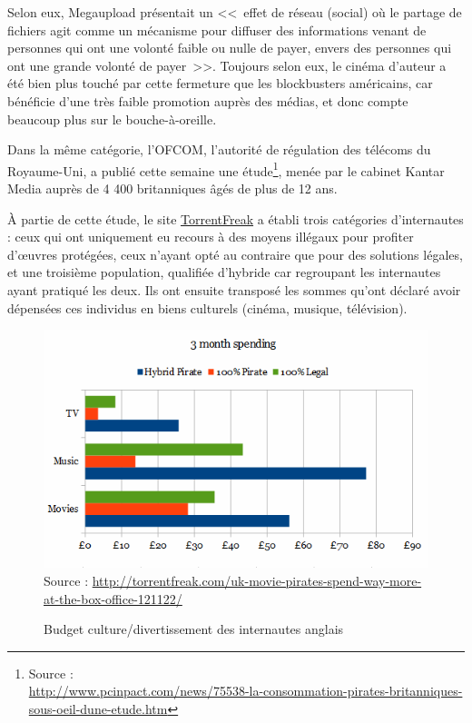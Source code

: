 Selon eux, Megaupload présentait un <<~effet de réseau (social) où le partage de fichiers agit comme un mécanisme pour diffuser des informations venant de personnes qui ont une volonté faible ou nulle de payer, envers des personnes qui ont une grande volonté de payer~>>.
Toujours selon eux, le cinéma d'auteur a été bien plus touché par cette fermeture que les blockbusters américains, car bénéficie d'une très faible promotion auprès des médias, et donc compte beaucoup plus sur le bouche-à-oreille.

Dans la même catégorie, l'OFCOM, l'autorité de régulation des télécoms du Royaume-Uni, a publié cette semaine une étude\footnote{Source :\\\url{http://www.pcinpact.com/news/75538-la-consommation-pirates-britanniques-sous-oeil-dune-etude.htm}}, menée par le cabinet Kantar Media auprès de 4 400 britanniques âgés de plus de 12 ans.

À partie de cette étude, le site \href{http://torrentfreak.com/uk-movie-pirates-spend-way-more-at-the-box-office-121122/}{TorrentFreak} a établi trois catégories d'internautes : ceux qui ont uniquement eu recours à des moyens illégaux pour profiter d'œuvres protégées, ceux n'ayant opté au contraire que pour des solutions légales, et une troisième population, qualifiée d'hybride car regroupant les internautes ayant pratiqué les deux.
Ils ont ensuite transposé les sommes qu'ont déclaré avoir dépensées ces individus en biens culturels (cinéma, musique, télévision).

\begin{figure}[H]
\center
\includegraphics[scale=.893]{images/budget-culture.png}
{\footnotesize Source : \url{http://torrentfreak.com/uk-movie-pirates-spend-way-more-at-the-box-office-121122/}}
\caption{Budget culture/divertissement des internautes anglais}
\end{figure}

